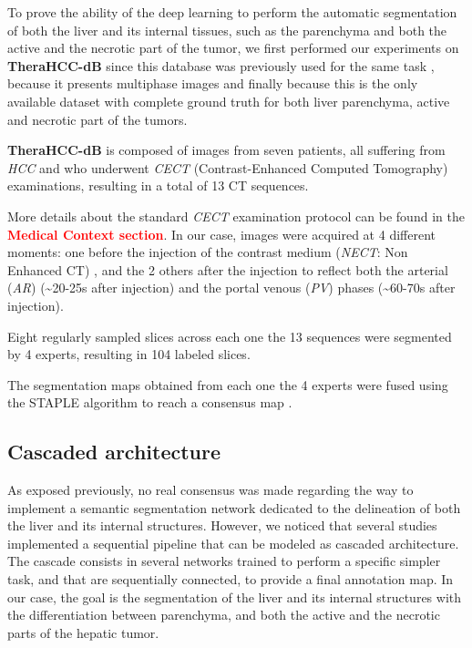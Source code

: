 \documentclass[]{article}
\newcommand{\lmttfont}[1]{{\fontfamily{lmtt}\selectfont #1}}
\begin{document}
	To prove the ability of the deep learning to perform the automatic
	segmentation of both the liver and its internal tissues, such as the
	parenchyma and both the active and the necrotic part of the tumor, we
	first performed our experiments on \textbf{\lmttfont{TheraHCC-dB}} since this database was
	previously used for the same task \cite{Conze2017}, because it
	presents multiphase images and finally because this is the only
	available dataset with complete ground truth for both liver parenchyma,
	active and necrotic part of the tumors.
	
	\textbf{\lmttfont{TheraHCC-dB}} is composed of images from seven patients, all suffering
	from \emph{HCC} and who underwent \emph{CECT} (Contrast-Enhanced
	Computed Tomography) examinations, resulting in a total of 13 CT
	sequences.
	
	More details about the standard \emph{CECT} examination protocol can be
	found in the \textcolor{red}{\textbf{Medical Context section}}. In our case, images were acquired at 4 different
	moments: one before the injection of the contrast medium (\emph{NECT}:
	Non Enhanced CT) , and the 2 others after the injection to reflect both
	the arterial (\emph{AR}) (\textasciitilde{}20-25s after injection) and
	the portal venous (\emph{PV}) phases (\textasciitilde{}60-70s after
	injection).
	
	Eight regularly sampled slices across each one the 13 sequences were
	segmented by 4 experts, resulting in 104 labeled slices.
	
	The segmentation maps obtained from each one the 4 experts were fused
	using the STAPLE algorithm to reach a consensus map \cite{Warfield2004}.
	
	\subsection*{Cascaded architecture}
	
	As exposed previously, no real consensus was made regarding the way to
	implement a semantic segmentation network dedicated to the delineation
	of both the liver and its internal structures. However, we noticed that
	several studies implemented a sequential pipeline that can be modeled as
	cascaded architecture. The cascade consists in several networks trained
	to perform a specific simpler task, and that are sequentially connected, to
	provide a final annotation map. In our case, the goal is the
	segmentation of the liver and its internal structures with the
	differentiation between parenchyma, and both the active and the necrotic
	parts of the hepatic tumor.
	
\end{document}
